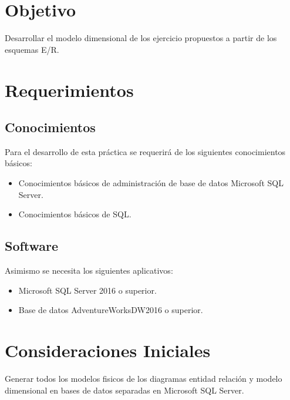\documentclass[12pt,letterpaper]{article}
\begin{document}
\section{Objetivo}

Desarrollar el modelo dimensional de los ejercicio propuestos a partir de los esquemas E/R.
\section {\textbf{Requerimientos}}

\subsection{\textbf{Conocimientos}}
Para el desarrollo de esta práctica se requerirá de los siguientes conocimientos básicos:
\begin{itemize}
\item Conocimientos básicos de administración de base de datos Microsoft SQL Server.
\item Conocimientos básicos de SQL.
\end{itemize}



\subsection{\textbf{Software}}
Asimismo se necesita los siguientes aplicativos:
\begin{itemize}
\item Microsoft SQL Server 2016 o superior.
\item Base de datos AdventureWorksDW2016 o superior.
\end{itemize}

\section{Consideraciones Iniciales}
Generar todos los modelos fisicos de los diagramas entidad relación y modelo dimensional en bases de datos separadas en Microsoft SQL Server.

\end{document}
